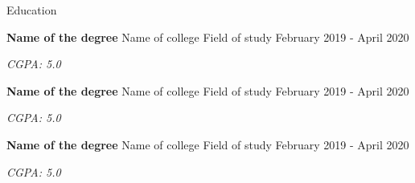 \documentclass{resume} %
\newcommand{\italicitem}[1]{\item{\textit{#1}}}
\begin{document}
\begin{rSection}{Education}

    \begin{rSubsectionNoBullet}
        {\bf Name of the degree}
        {Name of college}
        {Field of study}
        {February 2019 - April 2020}
        \italicitem{CGPA: 5.0}
    \end{rSubsectionNoBullet}
    
    \begin{rSubsectionNoBullet}
        {\bf Name of the degree}
        {Name of college}
        {Field of study}
        {February 2019 - April 2020}
        \italicitem{CGPA: 5.0}
    \end{rSubsectionNoBullet}
    
    \begin{rSubsectionNoBullet}
        {\bf Name of the degree}
        {Name of college}
        {Field of study}
        {February 2019 - April 2020}
        \italicitem{CGPA: 5.0}
    \end{rSubsectionNoBullet}

\end{rSection}

\end{document}

